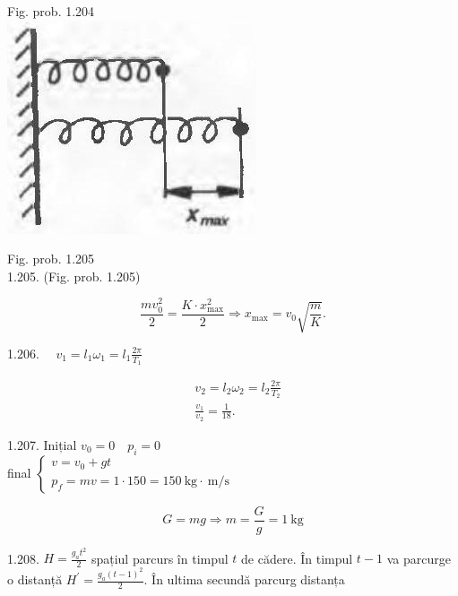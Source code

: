 \documentclass[10pt]{article}
\begin{document}
Fig. prob. 1.204\\
\includegraphics[max width=\textwidth, center]{2025_07_01_5b3ff9fa0d508c8e9f17g-242(1)}

Fig. prob. 1.205\\
1.205. (Fig. prob. 1.205)

$$
\frac{m v_{0}^{2}}{2}=\frac{K \cdot x_{\max }^{2}}{2} \Rightarrow x_{\max }=v_{0} \sqrt{\frac{m}{K}} .
$$

1.206. $\quad v_{1}=l_{1} \omega_{1}=l_{1} \frac{2 \pi}{T_{1}}$

$$
\begin{aligned}
& v_{2}=l_{2} \omega_{2}=l_{2} \frac{2 \pi}{T_{2}} \\
& \frac{v_{1}}{v_{2}}=\frac{1}{18} .
\end{aligned}
$$

1.207. Inițial $v_{0}=0 \quad p_{i}=0$\\
final $\left\{\begin{array}{l}v=v_{0}+g t \\ p_{f}=m v=1 \cdot 150=150 \mathrm{~kg} \cdot \mathrm{~m} / \mathrm{s}\end{array}\right.$

$$
G=m g \Rightarrow m=\frac{G}{g}=1 \mathrm{~kg}
$$

1.208. $H=\frac{g_{a} t^{2}}{2}$ spațiul parcurs în timpul $t$ de cădere. În timpul $t-1$ va parcurge o distanță $H^{\prime}=\frac{g_{a}(t-1)^{2}}{2}$. În ultima secundă parcurg distanța
\end{document}
